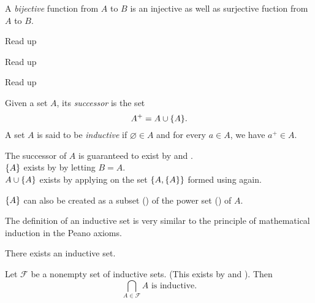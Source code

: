 \documentclass[12pt]{article}
\begin{document}
\begin{rem}
    A \emph{bijective} function from $A$ to $B$ is an injective as well as surjective fuction from $A$ to $B$.
\end{rem}

\begin{axiom} \label{zfc:regularity}
    Read up
\end{axiom}

\begin{axiom} \label{zfc:replacement}
    Read up
\end{axiom}

\begin{axiom} \label{zfc:choice}
    Read up
\end{axiom}

\begin{defn} \label{defn:inductive}
    Given a set $A$, its \emph{successor} is the set \[
        A^{+} = A \cup \set{A}.
    \] A set $A$ is said to be \emph{inductive} if $\varnothing \in A$ and for every $a \in A$, we have $a^{+} \in A$.
\end{defn}

\begin{rem}
    The successor of $A$ is guaranteed to exist by  and . \\
    $\set{A}$ exists by  by letting $B = A$. \\
    $A \cup \set{A}$ exists by applying  on the set $\set{A, \{A}\}$ formed using  again.

    $\set{A}$ can also be created as a subset () of the power set () of $A$.
\end{rem}

\begin{rem}
    The definition of an inductive set is very similar to the principle of mathematical induction in the Peano axioms.
\end{rem}

\begin{axiom} \label{zfc:infinity}
    There exists an inductive set.    
\end{axiom}

\begin{lem} \label{lem:inductive intersection}
    Let $\mathscr{F}$ be a nonempty set of inductive sets. (This exists by  and ). Then \[
        \bigcap_{A \in \mathscr{F}}{A} \text{ is inductive.}
    \]
\end{lem}
\end{document}
